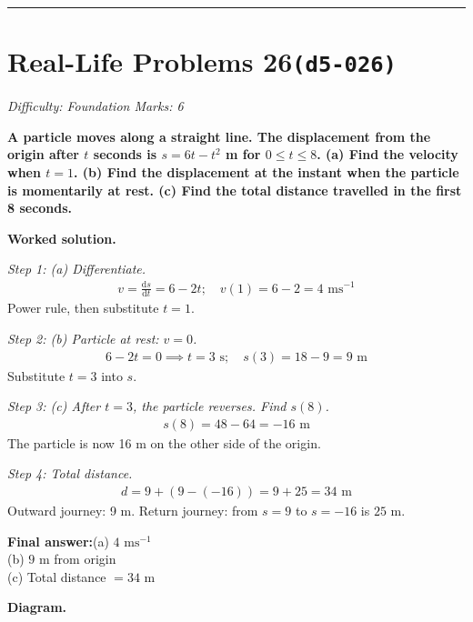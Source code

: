 \documentclass[11pt]{article}
\newcommand{\question}[1]{\par\medskip\noindent\textbf{#1}\par}
\begin{document}
\medskip\hrule

\section*{Real-Life Problems 26\quad\small\texttt{(d5-026)}}
\textit{Difficulty: Foundation \quad\textbar\quad Marks: 6}

\question{A particle moves along a straight line. The displacement from the origin after \( t \) seconds is \( s = 6t - t^2 \) m for \( 0 \leq t \leq 8 \). (a) Find the velocity when \( t = 1 \). (b) Find the displacement at the instant when the particle is momentarily at rest. (c) Find the total distance travelled in the first 8 seconds.}

\textbf{Worked solution.}

\textit{Step 1: (a) Differentiate.}
\[\begin{gathered}
v = \frac{\mathrm{d}s}{\mathrm{d}t} = 6 - 2t; \quad v(1) = 6 - 2 = 4 \text{ ms}^{-1}
\end{gathered}\]
Power rule, then substitute \( t = 1 \).

\textit{Step 2: (b) Particle at rest: \( v = 0 \).}
\[\begin{gathered}
6 - 2t = 0 \implies t = 3 \text{ s}; \quad s(3) = 18 - 9 = 9 \text{ m}
\end{gathered}\]
Substitute \( t = 3 \) into \( s \).

\textit{Step 3: (c) After \( t = 3 \), the particle reverses. Find \( s(8) \).}
\[\begin{gathered}
s(8) = 48 - 64 = -16 \text{ m}
\end{gathered}\]
The particle is now 16 m on the other side of the origin.

\textit{Step 4: Total distance.}
\[\begin{gathered}
d = 9 + (9 - (-16)) = 9 + 25 = 34 \text{ m}
\end{gathered}\]
Outward journey: 9 m. Return journey: from \( s = 9 \) to \( s = -16 \) is \( 25 \) m.

\begin{answerbox}
\textbf{Final answer:}\quad (a) \(\displaystyle  4 \text{ ms}^{-1} \) \\[3pt]  (b) \(\displaystyle  9 \) m from origin \\[3pt]  (c) Total distance \(\displaystyle  = 34 \) m
\end{answerbox}
\textbf{Diagram.}
\end{document}
